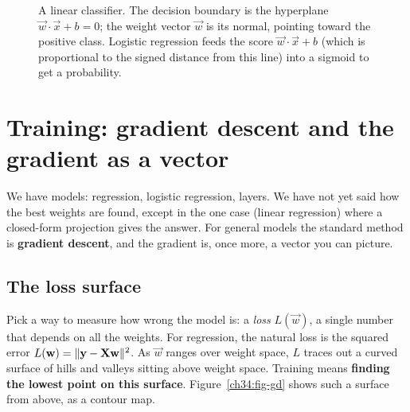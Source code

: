 \begin{figure}[htbp]
\centering
{}
\caption{A linear classifier. The decision boundary is the hyperplane
$\vec{w}\cdot\vec{x}+b=0$; the weight vector $\vec{w}$ is its normal, pointing toward the
positive class. Logistic regression feeds the score $\vec{w}\cdot\vec{x}+b$ (which is
proportional to the signed distance from this line) into a sigmoid to get a probability.}
\label{ch34:fig-classifier}
\end{figure}

\section{Training: gradient descent and the gradient as a vector}
\label{ch34:gd}

We have models: regression, logistic regression, layers. We have not yet said how the best
weights are found, except in the one case (linear regression) where a closed-form
projection gives the answer. For general models the standard method is \textbf{gradient
descent}, and the gradient is, once more, a vector you can picture.

\subsection{The loss surface}

Pick a way to measure how wrong the model is: a \emph{loss} $L(\vec{w})$, a single
number that depends on all the weights. For regression, the natural loss is the squared
error $L(\mathbf{w})=\lVert\mathbf{y}-\mathbf{X}\mathbf{w}\rVert^2$. As $\vec{w}$ ranges over weight space,
$L$ traces out a curved surface of hills and valleys sitting above weight space.
Training means \textbf{finding the lowest point on this surface}.
Figure~\ref{ch34:fig-gd} shows such a surface from above, as a contour map.

